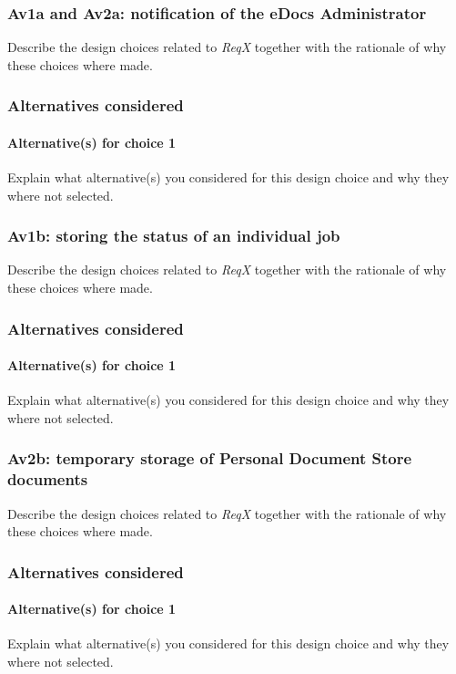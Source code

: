 \subsubsection{Av1a and Av2a: notification of the eDocs Administrator}
Describe the design choices related to \emph{ReqX} together with the rationale
of why these choices where made.

\subsubsection*{Alternatives considered}
\paragraph{Alternative(s) for choice 1} Explain what alternative(s) you
considered for this design choice and why they where not selected.

\subsubsection{Av1b: storing the status of an individual job}
Describe the design choices related to \emph{ReqX} together with the rationale
of why these choices where made.

\subsubsection*{Alternatives considered}
\paragraph{Alternative(s) for choice 1} Explain what alternative(s) you
considered for this design choice and why they where not selected.

\subsubsection{Av2b: temporary storage of Personal Document Store documents}
Describe the design choices related to \emph{ReqX} together with the rationale
of why these choices where made.

\subsubsection*{Alternatives considered}
\paragraph{Alternative(s) for choice 1} Explain what alternative(s) you
considered for this design choice and why they where not selected.

